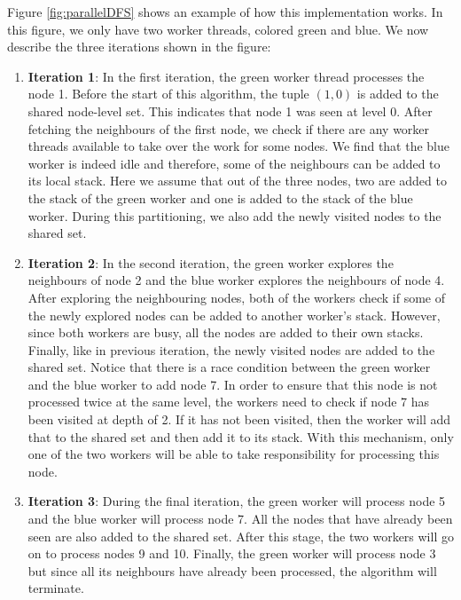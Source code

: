 Figure \ref{fig:parallelDFS} shows an example of how this implementation works.
In this figure, we only have
two worker threads, colored green and blue. We now describe the three iterations
shown in the figure:
\begin{enumerate}
    \item \textbf{Iteration 1}: In the first iteration, the green worker thread
        processes the node 1. Before the start of this
        algorithm, the tuple $(1,0)$ is added to the shared node-level
        set. This indicates that node 1 was seen at level 0. After
        fetching the neighbours of the first node, we check if there are any
        worker threads available to take over the work for some nodes. We find
        that the blue worker is indeed idle and therefore, some of the
        neighbours can be added to its local stack. Here we assume that out of
        the three nodes, two are added to the stack of the green worker and one
        is added to the stack of the blue worker. During this partitioning, we
        also add the newly visited nodes to the shared set. 
    \item \textbf{Iteration 2}: In the second iteration, the green worker
        explores the neighbours of node 2 and the blue worker
        explores the neighbours of node 4. After exploring the
        neighbouring nodes, both of the workers check if some of the newly
        explored nodes can be added to another worker's stack. However, since
        both workers are busy, all the nodes are added to their own stacks.
        Finally, like in previous iteration, the newly visited nodes are added
        to the shared set. Notice that there is a race condition between the
        green worker and the blue worker to add node 7. In order to ensure that
        this node is not processed twice at the same level, the workers need to
        check if node 7 has been visited at depth of 2. If it has not been
        visited, then the worker will add that to the shared set and then add it
        to its stack. With this mechanism, only one of the two workers will be
        able to take responsibility for processing this node.
    \item \textbf{Iteration 3}: During the final iteration, the green worker
        will process node 5 and the blue worker will process node 7. All the
        nodes that have already been seen are also added to the shared set.
        After this stage, the two workers will go on to process nodes 9 and 10.
        Finally, the green worker will process node 3 but since all its
        neighbours have already been processed, the algorithm will terminate.
\end{enumerate}
